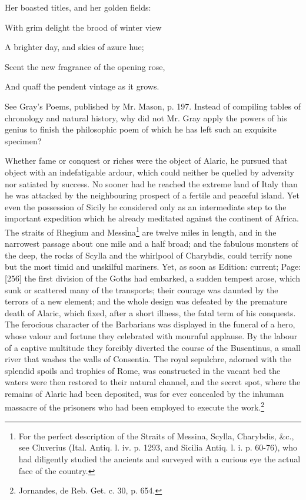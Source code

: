 {Her boasted titles, and her golden fields:

With grim delight the brood of winter view

A brighter day, and skies of azure hue;

Scent the new fragrance of the opening rose,

And quaff the pendent vintage as it grows.

See Gray\texthebrew{}’s Poems, published by Mr. Mason, p. 197. Instead of compiling tables of chronology and natural history, why did not Mr. Gray apply the powers of his genius to finish the philosophic poem of which he has left such an exquisite specimen?}

Whether fame or conquest or riches were the object of Alaric, he pursued that object with an indefatigable ardour, which could neither be quelled by adversity nor satiated by success. No sooner had he reached the extreme land of Italy than he was attacked by the neighbouring prospect of a fertile and peaceful island. Yet even the possession of Sicily he considered only as an intermediate step to the important expedition which he already meditated against the continent of Africa. The straits of Rhegium and Messina\footnote{For the perfect description of the Straits of Messina, Scylla, Charybdis, \&c., see Cluverius (Ital. Antiq. l. iv. p. 1293, and Sicilia Antiq. l. i. p. 60-76), who had diligently studied the ancients and surveyed with a curious eye the actual face of the country.} are twelve miles in length, and in the narrowest passage about one mile and a half broad; and the fabulous monsters of the deep, the rocks of Scylla and the whirlpool of Charybdis, could terrify none but the most timid and unskilful mariners. Yet, as soon as Edition: current; Page: [256] the first division of the Goths had embarked, a sudden tempest arose, which sunk or scattered many of the transports; their courage was daunted by the terrors of a new element; and the whole design was defeated by the premature death of Alaric, which fixed, after a short illness, the fatal term of his conquests. The ferocious character of the Barbarians was displayed in the funeral of a hero, whose valour and fortune they celebrated with mournful applause. By the labour of a captive multitude they forcibly diverted the course of the Busentinus, a small river that washes the walls of Consentia. The royal sepulchre, adorned with the splendid spoils and trophies of Rome, was constructed in the vacant bed the waters were then restored to their natural channel, and the secret spot, where the remains of Alaric had been deposited, was for ever concealed by the inhuman massacre of the prisoners who had been employed to execute the work.\footnote{Jornandes, de Reb. Get. c. 30, p. 654.}

